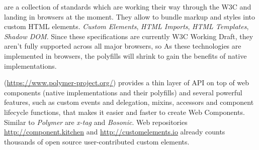 \begin{description}
\itemsep1pt\parskip0pt

\item[Web Components] are a collection of standards which are working their way through the W3C and landing in browsers at the moment. They allow to bundle markup and styles into custom HTML elements. \emph{Custom Elements}\cite{custom-elements}, \emph{HTML Imports}\cite{html-imports}, \emph{HTML Templates}\cite{html-templates}, \emph{Shadow DOM}\cite{shadow-dom}. Since these specifications are currently W3C Working Draft, they aren’t fully supported across all major browsers, so 
As these technologies are implemented in browsers, the polyfills will shrink to gain the benefits of native implementations. \cite{webcomponents-polyfills} 
        
\item[Polymer library] (\url{https://www.polymer-project.org/}) provides a thin layer of API on top of web components (native implementations and their polyfills) and several powerful features, such as custom events and delegation, mixins, accessors and component lifecycle functions, that makes it easier and faster to create Web Components. Similar to \emph{Polymer} are \emph{x-tag} and \emph{Bosonic}. Web repositories \url{http://component.kitchen} and \url{http://customelements.io} already counts thousands of open source user-contributed custom elements.
\end{description}


 

